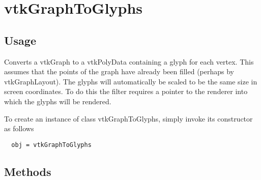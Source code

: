 \section{vtkGraphToGlyphs}

\subsection{Usage}

 Converts a vtkGraph to a vtkPolyData containing a glyph for each vertex.
 This assumes that the points
 of the graph have already been filled (perhaps by vtkGraphLayout).
 The glyphs will automatically be scaled to be the same size in screen
 coordinates. To do this the filter requires a pointer to the renderer
 into which the glyphs will be rendered.

To create an instance of class vtkGraphToGlyphs, simply
invoke its constructor as follows
\begin{verbatim}
  obj = vtkGraphToGlyphs
\end{verbatim}
\subsection{Methods}

